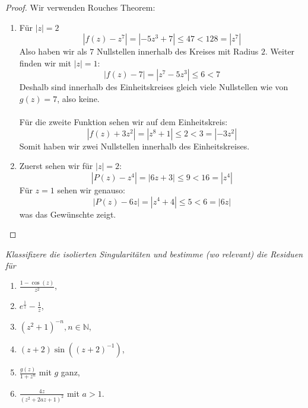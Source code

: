 \documentclass[11pt]{article}
\newenvironment{problem}[2][Beispiel]{
    \begin{trivlist}
        \item[\hskip \labelsep {\bfseries #1}\hskip \labelsep {\bfseries #2.}] \itshape}{
    \end{trivlist}\normalshape
}
\begin{document}
    \begin{proof}
        Wir verwenden Rouches Theorem:
        \begin{enumerate}[label = (\alph*)]
            \item Für $|z|=2$
            $$|f(z)-z^7| = |-5z^3+7|\leq 47< 128 = |z^7|$$
            Also haben wir als $7$ Nullstellen innerhalb des Kreises mit Radius $2$. Weiter finden wir
            mit $|z|=1$:
            $$|f(z)-7| = |z^7-5z^3| \leq 6 < 7$$
            Deshalb sind innerhalb des Einheitskreises gleich viele Nullstellen wie von $g(z)=7$, also keine.
            \\\\
            Für die zweite Funktion sehen wir auf dem Einheitskreis:
            $$|f(z)+ 3z^2| = |z^8 +1|\leq 2 < 3=|-3z^2|$$
            Somit haben wir zwei Nullstellen innerhalb des Einheitskreises.
            \item Zuerst sehen wir für $|z|=2$:
            $$|P(z)-z^4|=|6z+3|\leq 9< 16 = |z^4|$$
            Für $z=1$ sehen wir genauso:
            $$|P(z)-6z|=|z^4+4|\leq 5 < 6 = |6z|$$
            was das Gewünschte zeigt.
        \end{enumerate}
    \end{proof}

    \begin{problem}{5}
        Klassifizere die isolierten Singularitäten und bestimme (wo relevant) die Residuen für
        \begin{enumerate}[label = (\alph*)]
            \item $\frac{1-\cos (z)}{z^2}$,
            \item $e^{\frac{1}{z}}-\frac{1}{z}$,
            \item $\left(z^2+1\right)^{-n}, n \in \mathbb{N}$,
            \item $(z+2) \sin \left((z+2)^{-1}\right)$,
            \item $\frac{g(z)}{1+z^n}$ mit $g$ ganz,
            \item $\frac{4 z}{\left(z^2+2 a z+1\right)^2}$ mit $a>1$.
        \end{enumerate}
    \end{problem}
\end{document}
